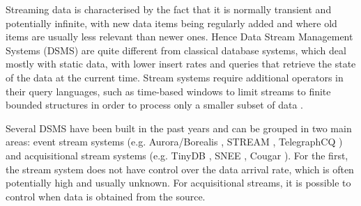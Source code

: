Streaming data is characterised by the fact that it is normally transient and potentially infinite, with new data items
being regularly added and where old items are usually less relevant than newer ones. Hence Data Stream Management
Systems (DSMS) are quite different from classical database systems, which deal mostly with static data, with lower
insert rates and queries that retrieve the state of the data at the current time. Stream systems require additional
operators in their query languages, such as time-based windows to limit streams to finite bounded structures in order
to process only a smaller subset of data \cite{Arasu_2006,Brenninkmeijer_08}.


Several DSMS have been built in the past years and can be grouped in two main areas: event stream systems (e.g. Aurora/Borealis \cite{Abadi_2005}, STREAM \cite{Arasu_06a}, TelegraphCQ \cite{Chandrasekaran_03}) and acquisitional stream systems (e.g. TinyDB \cite{Madden_05}, SNEE \cite{Galpin_09}, Cougar \cite{Yao_02}). For the first, the stream system does not have control over the data arrival rate, which is often potentially high and usually unknown. For acquisitional streams, it is possible to control when data is obtained from the source.

